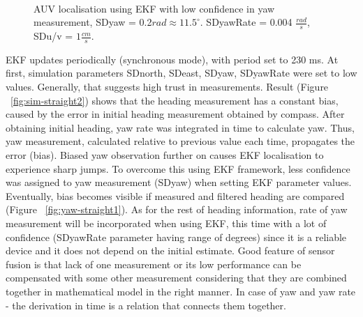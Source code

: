 \begin{figure}%
  \centering
     \\
\caption{AUV localisation using EKF with low confidence in yaw measurement, SDyaw = 0.2$rad \approx 11.5 ^{\circ}$. SDyawRate = 0.004 $\frac{rad}{s}$, SDu/v = $1\frac{cm}{s}$.}
\label{fig:auv-sim-straight1}
\end{figure}    
    
EKF updates periodically (synchronous mode), with period set to 230 ms. At first, simulation parameters SDnorth, SDeast, SDyaw, SDyawRate were set to low values. Generally, that suggests high trust in measurements. Result (Figure ~\ref{fig:sim-straight2}) shows that the heading measurement has a constant bias, caused by the error in initial heading measurement obtained by compass. After obtaining initial heading, yaw rate was integrated in time to calculate yaw. Thus, yaw measurement, calculated relative to previous value each time, propagates the error (bias). Biased yaw observation further on causes EKF localisation to experience sharp jumps. To overcome this using EKF framework, less confidence was assigned to yaw measurement (SDyaw) when setting EKF parameter values. Eventually, bias becomes visible if measured and filtered heading are compared (Figure ~\ref{fig:yaw-straight1}). As for the rest of heading information, rate of yaw measurement will be incorporated when using EKF, this time with a lot of confidence (SDyawRate parameter having range of degrees) since it is a reliable device and it does not depend on the initial estimate. Good feature of sensor fusion is that lack of one measurement or its low performance can be compensated with some other measurement considering that they are combined together in mathematical model in the right manner. In case of yaw and yaw rate - the derivation in time is a relation that connects them together. 

